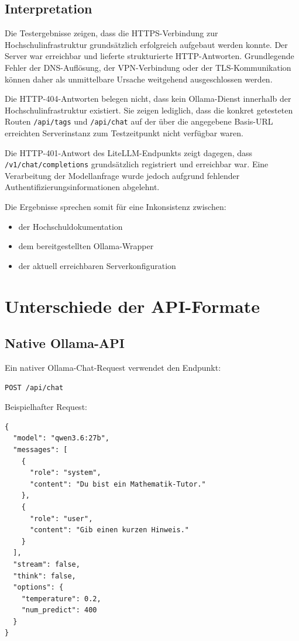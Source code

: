 \documentclass[11pt,a4paper,oneside,ngerman]{memoir}
\begin{document}
\section{Interpretation}

Die Testergebnisse zeigen, dass die HTTPS-Verbindung zur Hochschulinfrastruktur grundsätzlich erfolgreich aufgebaut werden konnte. Der Server war erreichbar und lieferte strukturierte HTTP-Antworten. Grundlegende Fehler der DNS-Auflösung, der VPN-Verbindung oder der TLS-Kommunikation können daher als unmittelbare Ursache weitgehend ausgeschlossen werden.

Die HTTP-404-Antworten belegen nicht, dass kein Ollama-Dienst innerhalb der Hochschulinfrastruktur existiert. Sie zeigen lediglich, dass die konkret getesteten Routen \texttt{/api/tags} und \texttt{/api/chat} auf der über die angegebene Basis-URL erreichten Serverinstanz zum Testzeitpunkt nicht verfügbar waren.

Die HTTP-401-Antwort des LiteLLM-Endpunkts zeigt dagegen, dass \texttt{/v1/chat/completions} grundsätzlich registriert und erreichbar war. Eine Verarbeitung der Modellanfrage wurde jedoch aufgrund fehlender Authentifizierungsinformationen abgelehnt.

Die Ergebnisse sprechen somit für eine Inkonsistenz zwischen:

\begin{itemize}
    \item der Hochschuldokumentation
    \item dem bereitgestellten Ollama-Wrapper
    \item der aktuell erreichbaren Serverkonfiguration
\end{itemize}

\chapter{Unterschiede der API-Formate}

\section{Native Ollama-API}

Ein nativer Ollama-Chat-Request verwendet den Endpunkt:

\begin{verbatim}
POST /api/chat
\end{verbatim}

Beispielhafter Request:

\begin{verbatim}
{
  "model": "qwen3.6:27b",
  "messages": [
    {
      "role": "system",
      "content": "Du bist ein Mathematik-Tutor."
    },
    {
      "role": "user",
      "content": "Gib einen kurzen Hinweis."
    }
  ],
  "stream": false,
  "think": false,
  "options": {
    "temperature": 0.2,
    "num_predict": 400
  }
}
\end{verbatim}
\end{document}
